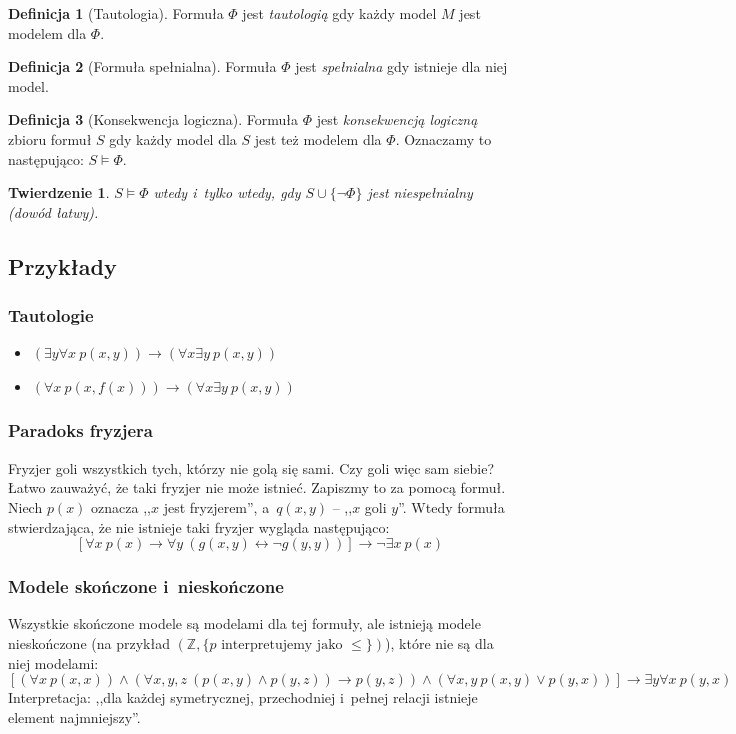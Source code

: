 \documentclass[10pt,a4paper]{article}
\theoremstyle{plain}
\newtheorem{theorem}{Twierdzenie}
\theoremstyle{definition}
\newtheorem*{definition}{Definicja}
\newcommand{\impl}{\rightarrow}
\begin{document}
\begin{definition}[Tautologia]
  Formuła $\Phi$ jest \emph{tautologią} gdy każdy model $M$ jest modelem dla
  $\Phi$.
\end{definition} 

\begin{definition}[Formuła spełnialna]
  Formuła $\Phi$ jest \emph{spełnialna} gdy istnieje dla niej model.
\end{definition} 

\begin{definition}[Konsekwencja logiczna]
  Formuła $\Phi$ jest \emph{konsekwencją logiczną} zbioru formuł $S$
  gdy każdy model dla $S$ jest też modelem dla $\Phi$. Oznaczamy to następująco:
  $S \models \Phi$.

  \begin{theorem}
    $S \models \Phi$ wtedy i~tylko wtedy, gdy $S \cup \lbrace\lnot\Phi\rbrace$
    jest niespełnialny (dowód łatwy).
  \end{theorem}
\end{definition}

\subsection{Przykłady}
\subsubsection{Tautologie}
\begin{itemize}
  \item $\left(\exists y \forall x~p(x,y)\right) \impl \left(\forall x \exists
      y~p(x,y)\right)$
  \item $\left(\forall x~p(x, f(x)) \right) \impl \left(\forall x \exists 
    y~p(x,y)\right)$
\end{itemize}
\subsubsection{Paradoks fryzjera}
Fryzjer goli wszystkich tych, którzy nie golą się sami. Czy goli więc sam
siebie?  Łatwo zauważyć, że taki fryzjer nie może istnieć. Zapiszmy to 
za pomocą formuł. Niech $p(x)$ oznacza ,,$x$ jest fryzjerem'', a~$q(x, y)$ --
,,$x$ goli $y$''. Wtedy formuła stwierdzająca, że nie istnieje taki fryzjer
wygląda następująco:
\[
  \left[\forall x~p(x)\impl \forall y~\left(g(x,y) \leftrightarrow \lnot g(y,y)
  \right)\right] \impl \lnot \exists x~p(x)
\]

\subsubsection{Modele skończone i~nieskończone}
Wszystkie skończone modele są modelami dla tej formuły, ale istnieją modele
nieskończone (na przykład $(\mathbb{Z}, \lbrace p \text{ interpretujemy jako }\le
\rbrace)$), które nie są dla niej modelami:
\[
  \left[\left(\forall x~p(x,x)\right) \land \left(\forall x, y, z~\left(p(x,y)
    \land p(y,z)\right) \impl p(y,z)\right) \land \left(\forall x,y~p(x,y)\lor
  p(y,x)\right)\right] \impl \exists y \forall x~p(y,x)
\]
Interpretacja: ,,dla każdej symetrycznej, przechodniej i~pełnej relacji
istnieje element najmniejszy''.
\end{document}
